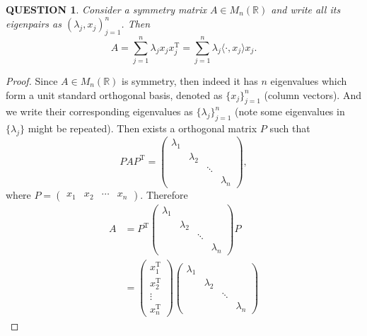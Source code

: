 \documentclass[12pt]{article}
\renewcommand{\(}{\left(}%
\renewcommand{\)}{\right)}%
\renewcommand{\[}{\left[}%
\renewcommand{\]}{\right]}%
\renewcommand{\r}{\mathbb{R}}
\newtheorem{question}{QUESTION}[section]}
\newtheorem{proof}{Proof.}}
\begin{document}
  \begin{question}
  	Consider a symmetry matrix $A\in M_n(\r)$ and write all its eigenpairs as $(\lambda_j,x_j)_{j=1}^n$. Then 
  	\begin{equation*}
  		A=\sum_{j=1}^n \lambda_j x_jx_j^\mathrm{T}=\sum_{j=1}^n \lambda_j \langle \cdot, x_j\rangle x_j.
  	\end{equation*}
  \end{question}
  \begin{proof}
  	Since $A\in M_n(\r)$ is symmetry, then indeed it has $n$ eigenvalues which form a unit standard orthogonal basis, denoted as $\{x_j\}_{j=1}^n$ (column vectors). And we write their corresponding eigenvalues as $\{\lambda_j\}_{j=1}^n$ (note some eigenvalues in $\{\lambda_j\}$ might be repeated). Then exists a orthogonal matrix $P$ such that 
  	\begin{equation*}
  		PAP^\mathrm{T} =
  		\begin{pmatrix}
  			\lambda_1 &  & & \\
  			 & \lambda_2 & & \\
  			 & &\ddots &\\
  			 & & & \lambda_n
  		\end{pmatrix},
  	\end{equation*}
  	where $P=\begin{pmatrix}
  		x_1 & x_2 & \cdots & x_n
  	\end{pmatrix}$. Therefore
  	\begin{equation*}
  		\begin{split}
  			A&=P^\mathrm{T}\begin{pmatrix}
  			\lambda_1 &  & & \\
  			 & \lambda_2 & & \\
  			 & &\ddots &\\
  			 & & & \lambda_n
  		\end{pmatrix}P\\
  		&= \begin{pmatrix}
  			x_1^\mathrm{T}\\
  			x_2^\mathrm{T}\\
  			\vdots\\
  			x_n^\mathrm{T}
  		\end{pmatrix}
  		\begin{pmatrix}
  			\lambda_1 &  & & \\
  			 & \lambda_2 & & \\
  			 & &\ddots &\\
  			 & & & \lambda_n
  		\end{pmatrix}

\end{split}
\end{equation*}
\end{proof}
\end{document}
